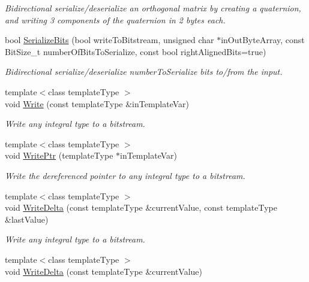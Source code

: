 \begin{DoxyCompactItemize}
\begin{DoxyCompactList}\small\item\em Bidirectional serialize/deserialize an orthogonal matrix by creating a quaternion, and writing 3 components of the quaternion in 2 bytes each. \end{DoxyCompactList}\item 
bool \hyperlink{class_rak_net_1_1_bit_stream_a25c0f31d16b211a2aa7cdb3ec594cbf9}{Serialize\-Bits} (bool write\-To\-Bitstream, unsigned char $\ast$in\-Out\-Byte\-Array, const Bit\-Size\-\_\-t number\-Of\-Bits\-To\-Serialize, const bool right\-Aligned\-Bits=true)
\begin{DoxyCompactList}\small\item\em Bidirectional serialize/deserialize number\-To\-Serialize bits to/from the input. \end{DoxyCompactList}\item 
{\footnotesize template$<$class template\-Type $>$ }\\void \hyperlink{class_rak_net_1_1_bit_stream_acc0d0bb96142a302385613d44e66558b}{Write} (const template\-Type \&in\-Template\-Var)
\begin{DoxyCompactList}\small\item\em Write any integral type to a bitstream. \end{DoxyCompactList}\item 
{\footnotesize template$<$class template\-Type $>$ }\\void \hyperlink{class_rak_net_1_1_bit_stream_a2aa6ce96e75cf8339c29d7101a5bdb3a}{Write\-Ptr} (template\-Type $\ast$in\-Template\-Var)
\begin{DoxyCompactList}\small\item\em Write the dereferenced pointer to any integral type to a bitstream. \end{DoxyCompactList}\item 
{\footnotesize template$<$class template\-Type $>$ }\\void \hyperlink{class_rak_net_1_1_bit_stream_abd8613fe1f3d998a125fd2962c905e67}{Write\-Delta} (const template\-Type \&current\-Value, const template\-Type \&last\-Value)
\begin{DoxyCompactList}\small\item\em Write any integral type to a bitstream. \end{DoxyCompactList}\item 
{\footnotesize template$<$class template\-Type $>$ }\\void \hyperlink{class_rak_net_1_1_bit_stream_a09461811793e5719e574d47bc513ac8a}{Write\-Delta} (const template\-Type \&current\-Value)

\end{DoxyCompactItemize}
